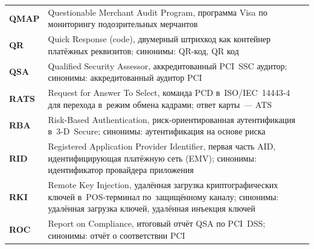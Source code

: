 \begin{longtable}{@{}p{4.5em}p{\dimexpr\linewidth-4.5em-2\tabcolsep\relax}@{}}
  \textbf{QMAP}              & Questionable Merchant Audit Program, программа Visa по мониторингу подозрительных мерчантов                                                                                                                                                                                                      \\
  \textbf{QR}                & Quick Response (code), двумерный штрихкод как контейнер платёжных реквизитов; синонимы: QR-код, QR код                                                                                                                                                                                           \\
  \textbf{QSA}               & Qualified Security Assessor, аккредитованный PCI~SSC аудитор; синонимы: аккредитованный аудитор PCI                                                                                                                                                                                              \\
  \textbf{RATS}              & Request for Answer To Select, команда PCD в~ISO/IEC~14443-4 для перехода в~режим обмена кадрами; ответ карты~--- ATS                                                                                                                                                                            \\
  \textbf{RBA}               & Risk-Based Authentication, риск-ориентированная аутентификация в~3-D~Secure; синонимы: аутентификация на основе риска                                                                                                                                                                            \\
  \textbf{RID}               & Registered Application Provider Identifier, первая часть AID, идентифицирующая платёжную сеть (EMV); синонимы: идентификатор провайдера приложения                                                                                                                                                \\
  \textbf{RKI}               & Remote Key Injection, удалённая загрузка криптографических ключей в~POS-терминал по~защищённому каналу; синонимы: удалённая загрузка ключей, удалённая инъекция ключей                                                                                                                           \\
  \textbf{ROC}               & Report on Compliance, итоговый отчёт QSA по PCI~DSS; синонимы: отчёт о соответствии PCI                                                                                                                                                                                                          \\

\end{longtable}
